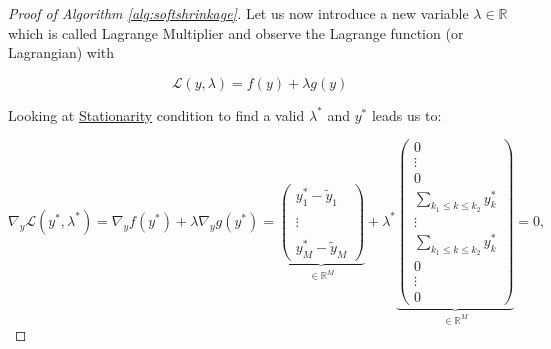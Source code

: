 \begin{proof}[Proof of Algorithm \ref{alg:softshrinkage}]
                Let us now introduce a new variable $\lambda \in \mathbb{R}$ which is called Lagrange Multiplier and observe the Lagrange function (or Lagrangian) with



                \begin{equation}
                    \mathcal{L}(y, \lambda) = f(y) + \lambda g(y)%
                \end{equation}

                Looking at \underline{Stationarity} condition to find a valid $\lambda^{\ast}$ and $y^{\ast}$ leads us to:

                \begin{equation}
                    \nabla_{y} \mathcal{L}(y^{\ast}, \lambda^{\ast}) = \nabla_{y} f(y^{\ast}) + \lambda \nabla_{y} g(y^{\ast}) =
                    \underbrace{\begin{pmatrix}
                        y^{\ast}_{1} - \tilde{y}_{1} \\
                         \\
                        \vdots \\
                         \\
                        y^{\ast}_{M} - \tilde{y}_{M}
                    \end{pmatrix}}_{\in \mathbb{R}^{M}}
                    + \lambda^{\ast}
                    \underbrace{\begin{pmatrix}
                        0 \\
                        \vdots \\
                        0 \\
                        \sum\limits_{k_{1} \le k \le k_{2}} y^{\ast}_{k} \\
                        \vdots \\
                        \sum\limits_{k_{1} \le k \le k_{2}} y^{\ast}_{k} \\
                        0 \\
                        \vdots \\
                        0
                    \end{pmatrix}}_{\in \mathbb{R}^{M}}
                    = 0,
                \end{equation}


\end{proof}
